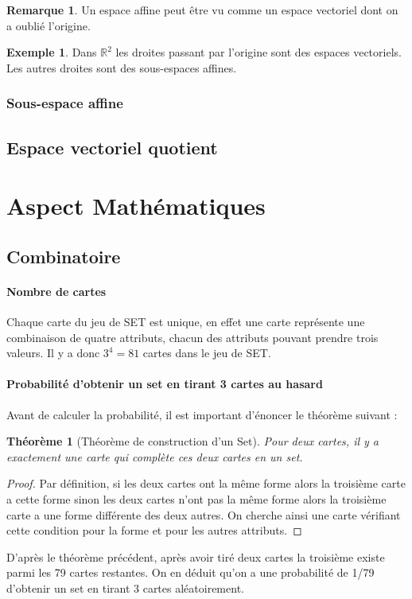 \documentclass[a4paper,12pt,titlepage]{article}
\theoremstyle{plain}
\newtheorem{thm}{Théorème}
\theoremstyle{definition}
\newtheorem{rmq}{Remarque}
\newtheorem{ex}{Exemple}
\begin{document}
\begin{rmq}
Un espace affine peut être vu comme un espace vectoriel dont on a oublié l'origine.
\end{rmq}
\begin{ex}
Dans $\mathbb{R}^2$ les droites passant par l'origine sont des espaces vectoriels. Les autres droites sont des sous-espaces affines. 
\end{ex}

\subsubsection{Sous-espace affine}

\subsection{Espace vectoriel quotient}

\newpage
\section{Aspect Mathématiques}
\subsection{Combinatoire}

\paragraph{Nombre de cartes} Chaque carte du jeu de SET est unique, en effet une carte représente une combinaison de quatre attributs, chacun des attributs pouvant prendre trois valeurs. 
Il y a donc $3^4=81$ cartes dans le jeu de SET.

\paragraph{Probabilité d'obtenir un set en tirant 3 cartes au hasard} Avant de calculer la probabilité, il est important d'énoncer le théorème suivant :

\begin{thm}[Théorème de construction d'un Set]\label{thm:Construction}
Pour deux cartes, il y a exactement une carte qui complète ces deux cartes en un set.
\end{thm}
\begin{proof}
Par définition, si les deux cartes ont la même forme alors la troisième carte a cette forme sinon les deux cartes n'ont pas la même forme alors la troisième carte a une forme différente des deux autres. On cherche ainsi une carte vérifiant cette condition pour la forme et pour les autres attributs.
\end{proof}
D'après le théorème précédent, après avoir tiré deux cartes la troisième existe parmi les 79 cartes restantes. On en déduit qu'on a une probabilité de 1/79 d'obtenir un set en tirant 3 cartes aléatoirement.
\end{document}
